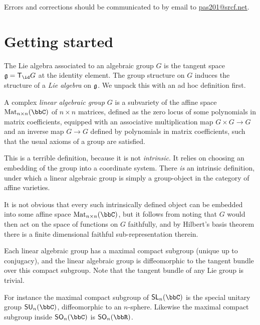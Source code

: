 Errors and corrections should be communicated to by email to
\url{pas201@srcf.net}.

\section{Getting started}

The Lie algebra associated to an algebraic group $G$ is the tangent space
$\frakg=\sf{T}_\id G$ at the identity element. The group structure on $G$ induces
the structure of a \emph{Lie algebra} on $\mathfrak{g}$. We unpack this with an ad hoc definition first. 

\begin{definition}[Ad hoc] A complex \emph{linear algebraic group} $G$ is a
    subvariety of the affine space $\Mat{n}(\bbC)$ of $n\times n$ matrices,
    defined as the zero locus of some polynomials in matrix coefficients,
    equipped with an associative multiplication map $G\times G\to G$ and an
    inverse map $G\to G$ defined by polynomials in matrix coefficients, such
    that the usual axioms of a group are satisfied.
\end{definition}

This is a terrible definition, because it is not \emph{intrinsic}. It relies on
choosing an embedding of the group into a coordinate system. There \emph{is} an
intrinsic definition, under which a linear algebraic group is simply a
group-object in the category of affine varieties. 

\begin{remark}
    It is not obvious that every such intrinsically defined object can be
    embedded into some affine space $\Mat{n}(\bbC)$, but it follows from noting that
    $G$ would then act on the space of functions on $G$ faithfully, and by
    Hilbert's basis theorem there is a finite dimensional faithful
    sub-representation therein.
\end{remark}

\begin{remark}
    Each linear algebraic group has a maximal compact subgroup (unique up to
    conjugacy), and the linear algebraic group is diffeomorphic to the tangent
    bundle over this compact subgroup. Note that the tangent bundle of any Lie
    group is trivial.

    For instance the maximal compact subgroup of $\sf{SL}_n(\bbC)$ is the special
    unitary group $\sf{SU}_n(\bbC)$, diffeomorphic to an $n$-sphere. Likewise
    the maximal compact subgroup inside $\sf{SO}_n(\bbC)$ is $\sf{SO}_n(\bbR)$.
\end{remark}

